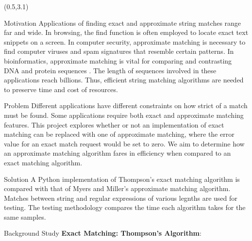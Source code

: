 \documentclass[22pt]{beamer}
\begin{document}
\begin{frame}[fragile]
\begin{textblock}{7.25}(0.5,3.1)

\begin{block}{Motivation}
Applications of finding exact and approximate string matches range far and wide. In browsing, the find function is often employed to locate exact text snippets on a screen. In computer security, approximate matching is necessary to find computer viruses and spam signatures that resemble certain patterns. In bioinformatics, approximate matching is vital for comparing and contrasting DNA and protein sequences \cite{Approx1}. The length of sequences involved in these applications reach billions. Thus, efficient string matching algorithms are needed to preserve time and cost of resources.
\end{block}

\begin{block}{Problem}
 Different applications have different constraints on how strict of a match must be found. Some applications require both exact and approximate matching features. This project explores whether or not an implementation of exact matching can be replaced with one of approximate matching, where the error value for an exact match request would be set to zero. We aim to determine how an approximate matching algorithm fares in efficiency when compared to an exact matching algorithm.  

\end{block}

\begin{block}{Solution}
A Python implementation of Thompson's exact matching algorithm is compared with that of Myers and Miller's approximate matching algorithm. Matches between string and regular expressions of various legnths are used for testing. The testing methodology compares the time each algorithm takes for the same samples. 
\end{block}


\begin{block}{Background Study}
\textbf{Exact Matching: Thompson's Algorithm}:



\vspace{5mm} %




\end{block}
\end{textblock}
\end{frame}
\end{document}
